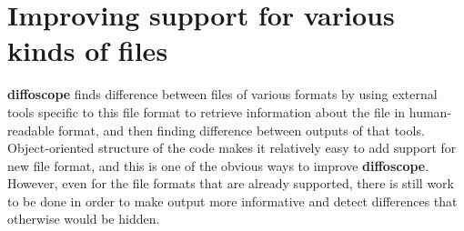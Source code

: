 \section{Improving support for various kinds of files}


\textbf{diffoscope} finds difference between files of various formats by using external
tools specific to this file format to retrieve information about the file in
human-readable format, and then finding difference between outputs of that tools.
Object-oriented structure of the code makes it relatively easy to add support for 
new file format, and this is one of the obvious ways to improve \textbf{diffoscope}.\\
However, even for the file formats that are already supported, there is still work 
to be done in order to make output more informative and detect differences that
otherwise would be hidden.\\

